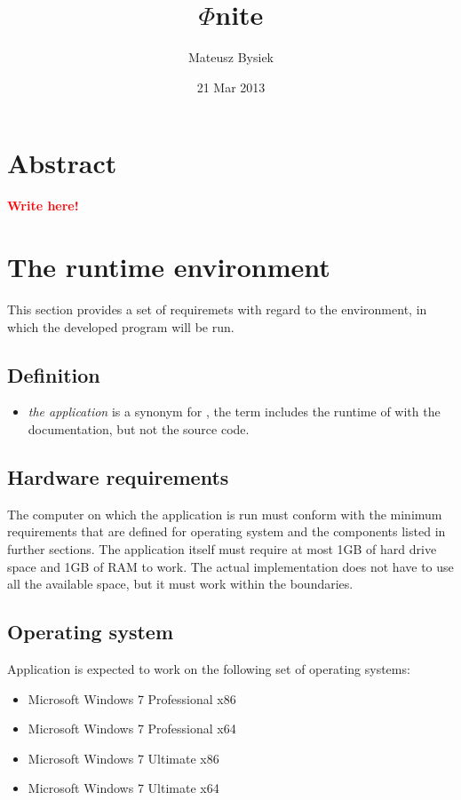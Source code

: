 \documentclass{article}
\title{$\Phi$nite}
\author{Mateusz Bysiek}
\date{21 Mar 2013}
\newcommand{\writehere}{\textbf{\textcolor{red}{Write here!}}}
\begin{document}


\section*{Abstract}

\writehere

\section{The runtime environment}

This section provides a set of requiremets with regard to the environment, in which the developed
program will be run.

\subsection*{Definition}

\begin{itemize}

  \item \textit{the application} is a synonym for \titletext, the term includes the runtime of
  \titletext with the documentation, but not the source code.

\end{itemize} 

\subsection{Hardware requirements}

The computer on which the application is run must conform with the minimum requirements that are
defined for operating system and the components listed in further sections. The application itself
must require at most 1GB of hard drive space and 1GB of RAM to work. The actual implementation does
not have to use all the available space, but it must work within the boundaries.

\subsection{Operating system}

Application is expected to work on the following set of operating systems:

\begin{itemize}

  \item Microsoft Windows 7 Professional x86

  \item Microsoft Windows 7 Professional x64

  \item Microsoft Windows 7 Ultimate x86

  \item Microsoft Windows 7 Ultimate x64

\end{itemize} 
\end{document}
